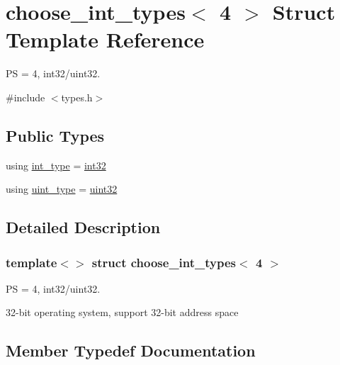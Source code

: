 \hypertarget{structchoose__int__types_3_014_01_4}{}\section{choose\+\_\+int\+\_\+types$<$ 4 $>$ Struct Template Reference}
\label{structchoose__int__types_3_014_01_4}


PS = 4, int32/uint32.  




{\ttfamily \#include $<$types.\+h$>$}

\subsection*{Public Types}
\begin{DoxyCompactItemize}
\item 
using \hyperlink{structchoose__int__types_3_014_01_4_af6cc8894e99e97c539077c9e640ed478}{int\+\_\+type} = \hyperlink{types_8h_a3d594eb72953c94a18a03d929ebd9167}{int32}
\item 
using \hyperlink{structchoose__int__types_3_014_01_4_a3c2319206150de67a68544e265dabb29}{uint\+\_\+type} = \hyperlink{types_8h_a8f95e75e58492e87412191fabadd8ca8}{uint32}
\end{DoxyCompactItemize}


\subsection{Detailed Description}
\subsubsection*{template$<$$>$\newline
struct choose\+\_\+int\+\_\+types$<$ 4 $>$}

PS = 4, int32/uint32. 

32-\/bit operating system, support 32-\/bit address space 

\subsection{Member Typedef Documentation}
\mbox{\label{structchoose__int__types_3_014_01_4_af6cc8894e99e97c539077c9e640ed478}} 

